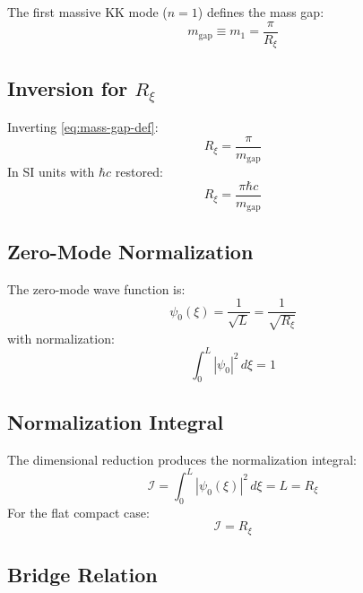 \documentclass[11pt,a4paper]{article}
\newcommand{\Rxi}{R_\xi}
\newcommand{\mgap}{m_{\mathrm{gap}}}
\theoremstyle{definition}
\theoremstyle{plain}
\theoremstyle{remark}
\begin{document}
The first massive KK mode ($n=1$) defines the mass gap:
\begin{equation}
\boxed{\mgap \equiv m_1 = \frac{\pi}{\Rxi}}
\label{eq:mass-gap-def}
\end{equation}

\subsection{Inversion for $\Rxi$}

Inverting \cref{eq:mass-gap-def}:
\begin{equation}
\boxed{\Rxi = \frac{\pi}{\mgap}}
\label{eq:rxi-from-gap}
\end{equation}
In SI units with $\hbar c$ restored:
\begin{equation}
\Rxi = \frac{\pi \hbar c}{\mgap}
\label{eq:rxi-si}
\end{equation}

\subsection{Zero-Mode Normalization}

The zero-mode wave function is:
\begin{equation}
\psi_0(\xi) = \frac{1}{\sqrt{L}} = \frac{1}{\sqrt{\Rxi}}
\label{eq:zero-mode}
\end{equation}
with normalization:
\begin{equation}
\int_0^L |\psi_0|^2 \, d\xi = 1
\label{eq:zero-mode-norm}
\end{equation}

\subsection{Normalization Integral}

The dimensional reduction produces the normalization integral:
\begin{equation}
\mathcal{I} = \int_0^L |\psi_0(\xi)|^2 \, d\xi = L = \Rxi
\label{eq:norm-integral}
\end{equation}
For the flat compact case:
\begin{equation}
\boxed{\mathcal{I} = \Rxi}
\label{eq:I-equals-Rxi}
\end{equation}

\subsection{Bridge Relation}
\end{document}
